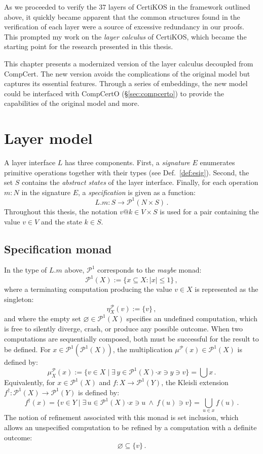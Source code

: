 \documentclass[11pt,oneside]{book}
\theoremstyle{definition}
\newcommand{\bdot}{\boldsymbol{\cdot}}
\begin{document}
As we proceeded to verify the 37 layers of CertiKOS
in the framework outlined above,
it quickly became apparent that
the common structures found in the verification of each layer
were a source of excessive redundancy in our proofs.
This prompted my work on the \emph{layer calculus} of CertiKOS,
which became the starting point for the research
presented in this thesis.

This chapter
presents a modernized version of the layer calculus
decoupled from CompCert.
The new version avoids the complications of the original model
but captures its essential features.
Through a series of embeddings,
the new model could be interfaced with
CompCertO (\S\ref{sec:compcerto})
to provide the capabilities of the original model
and more.



\section{Layer model} %

A layer interface $L$ has three components.
First, a \emph{signature} $E$ enumerates
primitive operations together with their types
(see Def.~\ref{def:esig}).
Second,
the set $S$ contains the \emph{abstract states} of the layer interface.
Finally, for each operation $m \mathbin: N$ in the signature $E$,
a \emph{specification}
is given as a function:
\[
  L.m : S \rightarrow \mathcal{P}^1( N \times S) \,.
\]
Throughout this thesis,
the notation $v@k \in V \times S$ is used for a pair
containing the value $v \in V$ and the state $k \in S$.

\subsection{Specification monad} %

In the type of $L.m$ above,
$\mathcal{P}^1$ corresponds to the \emph{maybe} monad:
\[
  \mathcal{P}^1(X) := \{ x \subseteq X : |x| \le 1 \} \,,
\]
where a terminating computation producing
the value $v \in X$ is represented as the singleton:
\[
  \eta^\mathcal{P}_X(v) := \{ v \} \,,
\]
and where the empty set $\varnothing \in \mathcal{P}^1(X)$
specifies an undefined computation,
which is free to silently diverge, crash, or
produce any possible outcome.
When two computations are sequentially composed,
both must be successful for the result to be defined.
For $x \in \mathcal{P}^1(\mathcal{P}^1(X))$,
the multiplication $\mu^\mathcal{P}(x) \in \mathcal{P}^1(X)$
is defined by:
\[
  \mu^\mathcal{P}_X(x) :=
    \{ v \in X \mid
       \exists \, y \in \mathcal{P}^1(X) \bdot x \ni y \ni v \} =
    \bigcup x
  \,.
\]
Equivalently,
for $x \in \mathcal{P}^1(X)$ and $f : X \rightarrow \mathcal{P}^1(Y)$,
the Kleisli extension
$f^\dagger : \mathcal{P}^1(X) \rightarrow \mathcal{P}^1(Y)$
is defined by:
\[
  f^\dagger(x)
    = \{ v \in Y \mid \exists \, u \in \mathcal{P}^1(X) \bdot x \ni u \:\wedge\: f(u) \ni v \}
    = \bigcup_{u \in x} f(u)
  \,.
\]
The notion of refinement associated with this monad is set inclusion,
which allows an unspecified computation to be refined by
a computation with a definite outcome:
\[
  \varnothing \subseteq \{ v \} \,.
\]
\end{document}
